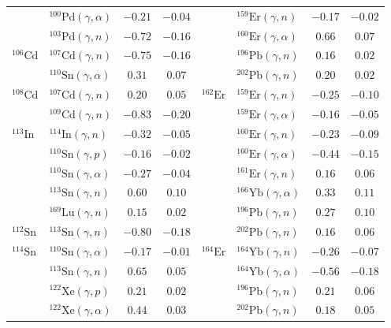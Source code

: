 \begin{table}
\begin{tabular}{llcc|llcc}
    $ $ & $^{100}\mathrm{Pd}(\gamma,\alpha)$ & $-0.21$ & $-0.04$ & $ $ & $^{159}\mathrm{Er}(\gamma,n)$ & $-0.17$ & $-0.02$ \\ 
    $ $ & $^{103}\mathrm{Pd}(\gamma,n)$ & $-0.72$ & $-0.16$ & $ $ & $^{160}\mathrm{Er}(\gamma,\alpha)$ & $0.66$ & $0.07$ \\ 
    $^{106}\mathrm{Cd}$ & $^{107}\mathrm{Cd}(\gamma,n)$ & $-0.75$ & $-0.16$ & $ $ & $^{196}\mathrm{Pb}(\gamma,n)$ & $0.16$ & $0.02$ \\ 
    $ $ & $^{110}\mathrm{Sn}(\gamma,\alpha)$ & $0.31$ & $0.07$ & $ $ & $^{202}\mathrm{Pb}(\gamma,n)$ & $0.20$ & $0.02$ \\ 
    $^{108}\mathrm{Cd}$ & $^{107}\mathrm{Cd}(\gamma,n)$ & $0.20$ & $0.05$ & $^{162}\mathrm{Er}$ & $^{159}\mathrm{Er}(\gamma,n)$ & $-0.25$ & $-0.10$ \\ 
    $ $ & $^{109}\mathrm{Cd}(\gamma,n)$ & $-0.83$ & $-0.20$ & $ $ & $^{159}\mathrm{Er}(\gamma,\alpha)$ & $-0.16$ & $-0.05$ \\ 
    $^{113}\mathrm{In}$ & $^{114}\mathrm{In}(\gamma,n)$ & $-0.32$ & $-0.05$ & $ $ & $^{160}\mathrm{Er}(\gamma,n)$ & $-0.23$ & $-0.09$ \\ 
    $ $ & $^{110}\mathrm{Sn}(\gamma,p)$ & $-0.16$ & $-0.02$ & $ $ & $^{160}\mathrm{Er}(\gamma,\alpha)$ & $-0.44$ & $-0.15$ \\ 
    $ $ & $^{110}\mathrm{Sn}(\gamma,\alpha)$ & $-0.27$ & $-0.04$ & $ $ & $^{161}\mathrm{Er}(\gamma,n)$ & $0.16$ & $0.06$ \\ 
    $ $ & $^{113}\mathrm{Sn}(\gamma,n)$ & $0.60$ & $0.10$ & $ $ & $^{166}\mathrm{Yb}(\gamma,\alpha)$ & $0.33$ & $0.11$ \\ 
    $ $ & $^{169}\mathrm{Lu}(\gamma,n)$ & $0.15$ & $0.02$ & $ $ & $^{196}\mathrm{Pb}(\gamma,n)$ & $0.27$ & $0.10$ \\ 
    $^{112}\mathrm{Sn}$ & $^{113}\mathrm{Sn}(\gamma,n)$ & $-0.80$ & $-0.18$ & $ $ & $^{202}\mathrm{Pb}(\gamma,n)$ & $0.16$ & $0.06$ \\ 
    $^{114}\mathrm{Sn}$ & $^{110}\mathrm{Sn}(\gamma,\alpha)$ & $-0.17$ & $-0.01$ & $^{164}\mathrm{Er}$ & $^{164}\mathrm{Yb}(\gamma,n)$ & $-0.26$ & $-0.07$ \\ 
    $ $ & $^{113}\mathrm{Sn}(\gamma,n)$ & $0.65$ & $0.05$ & $ $ & $^{164}\mathrm{Yb}(\gamma,\alpha)$ & $-0.56$ & $-0.18$ \\ 
    $ $ & $^{122}\mathrm{Xe}(\gamma,p)$ & $0.21$ & $0.02$ & $ $ & $^{196}\mathrm{Pb}(\gamma,n)$ & $0.21$ & $0.06$ \\ 
    $ $ & $^{122}\mathrm{Xe}(\gamma,\alpha)$ & $0.44$ & $0.03$ & $ $ & $^{202}\mathrm{Pb}(\gamma,n)$ & $0.18$ & $0.05$ \\ 

\end{tabular}
\end{table}
